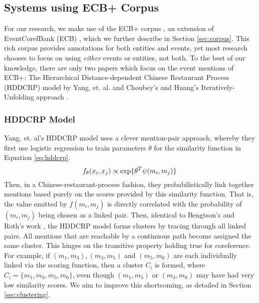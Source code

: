 \documentclass[11pt,a4paper]{article}
\begin{document}
\subsection{Systems using ECB+ Corpus}
For our research, we make use of the ECB+ corpus \cite{ECB+}, an extension of EventCorefBank (ECB) \cite{Bejan:2010:UEC:1858681.1858824}, which we further describe in Section \ref{sec:corpus}.  This rich corpus provides annotations for both entities and events, yet most research chooses to focus on using \textit{either} events or entities, not both.  To the best of our knowledge, there are only two papers which focus on the event mentions of ECB+: The Hierarchical Distance-dependent Chinese Restaurant Process (HDDCRP) model by Yang, et. al.  and Choubey's and Huang's Iteratively-Unfolding approach .

\subsubsection{HDDCRP Model}
\label{sec:HDDCRP}
Yang, et. al's HDDCRP model  uses a clever mention-pair approach, whereby they first use logistic regression to train parameters $\theta$ for the similarity function in Equation \ref{eq:hddcrp}.  
\begin{equation}
\label{eq:hddcrp}
f_{\theta}(x_i,x_j) \propto \textnormal{exp\{} \theta^T\psi(m_i,m_j)\textnormal{\}}
\end{equation}
Then, in a Chinese-restaurant-process fashion, they probabilistically link together mentions based purely on the scores provided by this similarity function.  That is, the value emitted by $f(m_i,m_j)$ is directly correlated with the probability of $(m_i,m_j)$ being chosen as a linked pair.  Then, identical to Bengtson's and Roth's work \cite{Bengtson:2008:UVF:1613715.1613756}, the HDDCRP model forms clusters by tracing through all linked pairs. All mentions that are reachable by a continuous path become assigned the same cluster.  This hinges on the transitive property holding true for coreference.  For example, if ${(m_1,m_3),(m_3,m_5)}$ and $(m_5,m_6)$ are each individually linked via the scoring function, then a cluster $C_i$ is formed, where $C_i = \{m_1,m_3,m_5,m_6\}$, even though $(m_1,m_5)$ or $(m_3,m_6)$ may have had very low similarity scores. We aim to improve this shortcoming, as detailed in Section \ref{sec:clustering}.
\end{document}
